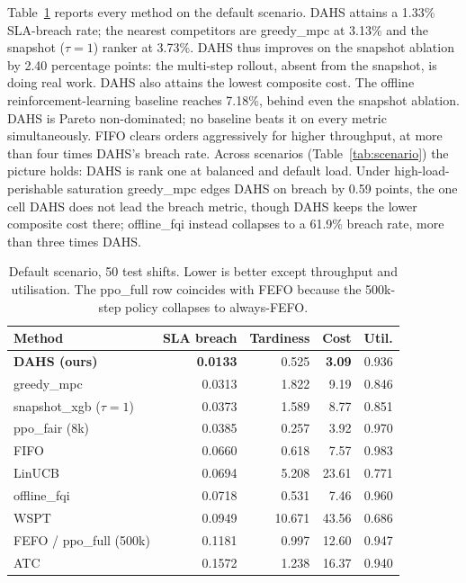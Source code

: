 \documentclass[conference]{IEEEtran}
\begin{document}
Table~\ref{tab:main} reports every method on the default scenario. DAHS attains a
1.33\% SLA-breach rate; the nearest competitors are greedy\_mpc at 3.13\% and the
snapshot ($\tau{=}1$) ranker at 3.73\%. DAHS thus improves on the snapshot ablation
by 2.40 percentage points: the multi-step rollout, absent from the snapshot, is
doing real work. DAHS also attains the lowest composite cost. The offline
reinforcement-learning baseline reaches 7.18\%, behind even the snapshot ablation.
DAHS is Pareto non-dominated; no baseline beats it on every metric simultaneously.
FIFO clears orders aggressively for higher throughput, at more than four times
DAHS's breach rate. Across scenarios (Table~\ref{tab:scenario}) the picture holds:
DAHS is rank one at balanced and default load. Under high-load-perishable
saturation greedy\_mpc edges DAHS on breach by 0.59 points, the one cell DAHS does
not lead the breach metric, though DAHS keeps the lower composite cost there;
offline\_fqi instead collapses to a 61.9\% breach rate, more than three times DAHS.

\begin{table}[t]
\centering
\caption{Default scenario, 50 test shifts. Lower is better except throughput and
utilisation. The ppo\_full row coincides with FEFO because the 500k-step policy
collapses to always-FEFO.}
\label{tab:main}
\begin{tabular}{lrrrr}
\toprule
Method & SLA breach & Tardiness & Cost & Util. \\
\midrule
\textbf{DAHS (ours)}        & \textbf{0.0133} & 0.525  & \textbf{3.09}  & 0.936 \\
greedy\_mpc                 & 0.0313 & 1.822  & 9.19  & 0.846 \\
snapshot\_xgb ($\tau{=}1$)  & 0.0373 & 1.589  & 8.77  & 0.851 \\
ppo\_fair (8k)              & 0.0385 & 0.257  & 3.92  & 0.970 \\
FIFO                        & 0.0660 & 0.618  & 7.57  & 0.983 \\
LinUCB                      & 0.0694 & 5.208  & 23.61 & 0.771 \\
offline\_fqi                & 0.0718 & 0.531  & 7.46  & 0.960 \\
WSPT                        & 0.0949 & 10.671 & 43.56 & 0.686 \\
FEFO / ppo\_full (500k)     & 0.1181 & 0.997  & 12.60 & 0.947 \\
ATC                         & 0.1572 & 1.238  & 16.37 & 0.940 \\
\bottomrule
\end{tabular}
\end{table}
\end{document}
